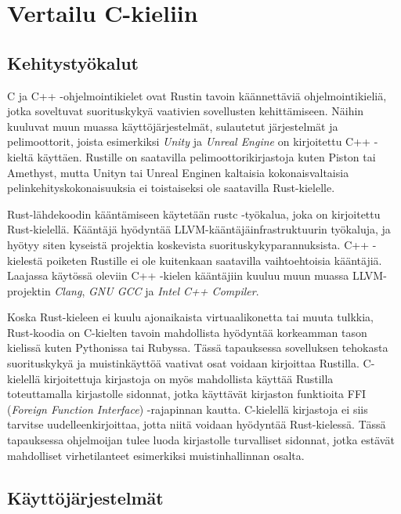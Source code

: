 \documentclass[finnish]{tktltiki2}
\theoremstyle{definition}
\theoremstyle{remark}
\begin{document}
\section{Vertailu C-kieliin}

\subsection{Kehitystyökalut}

C ja C++ -ohjelmointikielet ovat Rustin tavoin käännettäviä ohjelmointikieliä, jotka soveltuvat suorituskykyä vaativien sovellusten kehittämiseen. Näihin kuuluvat muun muassa käyttöjärjestelmät, sulautetut järjestelmät ja pelimoottorit, joista esimerkiksi \textit{Unity} ja \textit{Unreal Engine} on kirjoitettu C++ -kieltä käyttäen. Rustille on saatavilla pelimoottorikirjastoja kuten Piston tai Amethyst, mutta Unityn tai Unreal Enginen kaltaisia kokonaisvaltaisia pelinkehityskokonaisuuksia ei toistaiseksi ole saatavilla Rust-kielelle.\cite{AreWeGameYetEngines}

Rust-lähdekoodin kääntämiseen käytetään rustc -työkalua, joka on kirjoitettu Rust-kielellä. Kääntäjä hyödyntää LLVM-kääntäjäinfrastruktuurin työkaluja, ja hyötyy siten kyseistä projektia koskevista suorituskykyparannuksista. \cite{HowFastIsRust} C++ -kielestä poiketen Rustille ei ole kuitenkaan saatavilla vaihtoehtoisia kääntäjiä. Laajassa käytössä oleviin C++ -kielen kääntäjiin kuuluu muun muassa LLVM-projektin \textit{Clang}, \textit{GNU GCC} ja \textit{Intel C++ Compiler}.

Koska Rust-kieleen ei kuulu ajonaikaista virtuaalikonetta tai muuta tulkkia, Rust-koodia on C-kielten tavoin mahdollista hyödyntää korkeamman tason kielissä kuten Pythonissa tai Rubyssa. Tässä tapauksessa sovelluksen tehokasta suorituskykyä ja muistinkäyttöä vaativat osat voidaan kirjoittaa Rustilla.\cite{RustInsideOtherLanguages} C-kielellä kirjoitettuja kirjastoja on myös mahdollista käyttää Rustilla toteuttamalla kirjastolle sidonnat, jotka käyttävät kirjaston funktioita FFI (\textit{Foreign Function Interface}) -rajapinnan kautta. C-kielellä kirjastoja ei siis tarvitse uudelleenkirjoittaa, jotta niitä voidaan hyödyntää Rust-kielessä. Tässä tapauksessa ohjelmoijan tulee luoda kirjastolle turvalliset sidonnat, jotka estävät mahdolliset virhetilanteet esimerkiksi muistinhallinnan osalta.

\subsection{Käyttöjärjestelmät}
\end{document}
